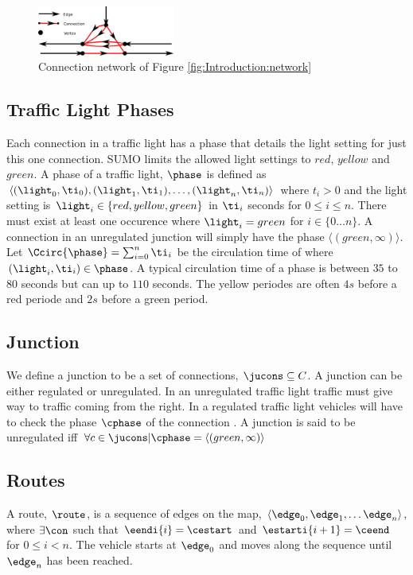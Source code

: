 \begin{figure}[h]
\centering
\includegraphics[width=0.4\textwidth]{../images/ConnectionNetwork.png}
\caption{Connection network of Figure \ref{fig:Introduction:network}}
\label{fig:Model:Connection}
\end{figure}

\subsection{Traffic Light Phases}\label{sec:phases}
Each connection in a traffic light has a phase that details the light setting for just this one connection.
SUMO limits the allowed light settings to $red$, $yellow$ and $green$.
A phase of a traffic light, $\phase$ is defined as $\langle(\light_0, \ti_0),(\light_1, \ti_1),\dots, (\light_n, \ti_n) \rangle$ where $t_i>0$ and the light setting is $\light_i\in \{red, yellow, green\}$ in $\ti_i$ seconds for $0 \leq i \leq n$.
There must exist at least one occurence where $\light_i = green$ for $i \in \{0 \dots n\}$. 
A connection in an unregulated junction will simply have the phase $\langle(green, \infty)\rangle$.
Let $\Ccirc{\phase} = \sum_{i=0}^{n}\ti_i$ be the circulation time of \phase where $(\light_i, \ti_i)\in \phase$.
A typical circulation time of a phase is between $35$ to $80$ seconds but can up to $110$ seconds. 
The yellow periodes are often $4s$ before a red periode and $2s$ before a green period\cite{vejtrafik}.

\subsection{Junction}
We define a junction \ju to be a set of connections, $\jucons \subseteq C$. 
A junction can be either regulated or unregulated. 
In an unregulated traffic light traffic must give way to traffic coming from the right. 
In a regulated traffic light vehicles will have to check the phase $\cphase$ of the connection \vehpos. 
A junction is said to be unregulated iff $\forall c \in \jucons | \cphase = \langle(green, \infty)\rangle$

\subsection{Routes}
A route, $\route$, is a sequence of edges on the map, $\langle \edge_0, \edge_1, \dots \edge_n \rangle$, where $\exists \con$ such that $\eendi{i} = \cestart$ and $\estarti{i+1} = \ceend$ for $0\leq i< n$.
The vehicle starts at $\edge_0$ and moves along the sequence until $\edge_n$ has been reached.





